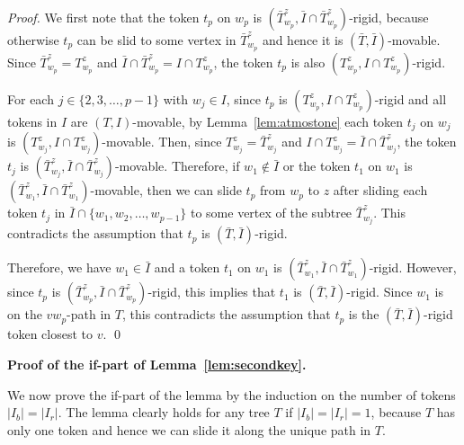 \documentclass{llncs}
\newcommand{\msize}[1]{{\left|#1\right|}}
\newcommand{\Tsub}[2]{T_{#1}^{#2}}
\newcommand{\bfI}{I}
\newcommand{\Tminus}{\bar{T}}
\newcommand{\Tmsub}[2]{\Tminus_{#1}^{#2}}
\newcommand{\Iminus}{\bar{I}}
\newcounter{one}
\begin{document}
\begin{proof}
	We first note that the token $t_p$ on $w_p$ is $(\Tmsub{w_p}{z}, \Iminus \cap \Tmsub{w_p}{z})$-rigid, because otherwise $t_p$ can be slid to some vertex in $\Tmsub{w_p}{z}$ and hence it is $(\Tminus, \Iminus)$-movable. 
	Since $\Tmsub{w_p}{z} = \Tsub{w_p}{z}$ and $\Iminus \cap \Tmsub{w_p}{z} = \bfI \cap \Tsub{w_p}{z}$, the token $t_p$ is also $(\Tsub{w_p}{z}, \bfI \cap \Tsub{w_p}{z})$-rigid. 
	
	For each $j \in \{2,3,\ldots, p-1\}$ with $w_j \in \bfI$, since $t_p$ is $(\Tsub{w_p}{z}, \bfI \cap \Tsub{w_p}{z})$-rigid and all tokens in $\bfI$ are $(T, \bfI)$-movable, by Lemma~\ref{lem:atmostone} each token $t_j$ on $w_j$ is $(\Tsub{w_j}{z}, \bfI \cap \Tsub{w_j}{z})$-movable. 
	Then, since $\Tsub{w_j}{z} = \Tmsub{w_j}{z}$ and $\bfI \cap \Tsub{w_j}{z} = \Iminus \cap \Tmsub{w_j}{z}$, the token $t_j$ is $(\Tmsub{w_j}{z}, \Iminus \cap \Tmsub{w_j}{z})$-movable. 
	Therefore, if $w_1 \not\in \Iminus$ or the token $t_1$ on $w_1$ is $(\Tmsub{w_1}{z}, \Iminus \cap \Tmsub{w_1}{z})$-movable, then we can slide $t_p$ from $w_p$ to $z$ after sliding each token $t_j$ in $\Iminus \cap \{ w_1, w_2, \ldots, w_{p-1} \}$ to some vertex of the subtree $\Tmsub{w_j}{z}$.
	This contradicts the assumption that $t_p$ is $(\Tminus, \Iminus)$-rigid. 
	
	Therefore, we have $w_1 \in \Iminus$ and a token $t_1$ on $w_1$ is $(\Tmsub{w_1}{z}, \Iminus \cap \Tmsub{w_1}{z})$-rigid. 
	However, since $t_p$ is $(\Tmsub{w_p}{z}, \Iminus \cap \Tmsub{w_p}{z})$-rigid, this implies that $t_1$ is $(\Tminus, \Iminus)$-rigid. 
	Since $w_1$ is on the $vw_p$-path in $T$, this contradicts the assumption that $t_p$ is the $(\Tminus, \Iminus)$-rigid token closest to $v$.  
\qed
\end{proof}



\smallskip

\noindent
	{\bf Proof of the if-part of Lemma~\ref{lem:secondkey}.}
	
	We now prove the if-part of the lemma by the induction on the number of tokens $\msize{\bfI_b} = \msize{\bfI_r}$. 
	The lemma clearly holds for any tree $T$ if $\msize{\bfI_b} = \msize{\bfI_r} = 1$, because $T$ has only one token and hence we can slide it along the unique path in $T$. 
	
\end{document}
